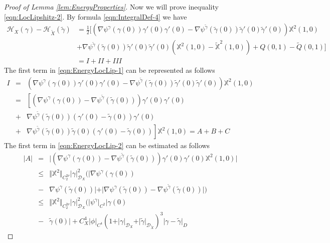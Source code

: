 \documentclass[11pt,a4paper,leqno]{amsart}%
\theoremstyle{plain}
\theoremstyle{remark}
\theoremstyle{plain}
\numberwithin{equation}{section}
\begin{document}
\begin{proof}[ Proof of Lemma \ref{lem:EnergyProperties}]
Now we will prove inequality \eqref{eqn:LocLipshitz-2}. By formula
\eqref{eqn:IntegralDef-4} we have
\begin{align}\label{eqn:EnergyLocLip-1}
\mathcal{H}_X(\gamma)-\mathcal{H}_{\tilde{X}}(\tilde{\gamma})&=\frac{1}{2}
\Big[(\nabla\psi^{\gamma}(\gamma(0))\gamma'(0)\gamma'(0)-\nabla\psi^{\tilde{\gamma}}(\tilde{\gamma}(0))\tilde{\gamma}'(0)\tilde{\gamma}'(0))
\mathbb{X}^2(1,0)\nonumber\\
&+\nabla\psi^{\tilde{\gamma}}(\tilde{\gamma}(0))\tilde{\gamma}'(0)\tilde{\gamma}'(0)(\mathbb{X}^2(1,0)-\mathbb{\tilde{X}}^2(1,0))
+Q(0,1)-\tilde{Q}(0,1)\Big]\!
\nonumber\\
 &=\!I\! +\! II\! +\! III
\end{align}
The first term in \eqref{eqn:EnergyLocLip-1} can be represented as
follows
\begin{eqnarray}
I &=&
(\nabla\psi^{\gamma}(\gamma(0))\gamma'(0)\gamma'(0)-\nabla\psi^{\tilde{\gamma}}(\tilde{\gamma}(0))\tilde{\gamma}'(0)\tilde{\gamma}'(0))
\mathbb{X}^2(1,0)\nonumber\\
 &=& \left[(\nabla\psi^{\gamma}(\gamma(0))-\nabla\psi^{\tilde{\gamma}}(\tilde{\gamma}(0)))\gamma'(0)\gamma'(0)\right.\nonumber\\
 &+& \nabla\psi^{\tilde{\gamma}}(\tilde{\gamma}(0))(\gamma'(0)-\tilde{\gamma}(0))\gamma'(0)\nonumber\\
 &+& \left.\nabla\psi^{\tilde{\gamma}}(\tilde{\gamma}(0))\tilde{\gamma}(0)(\gamma'(0)-\tilde{\gamma}(0))\right]\mathbb{X}^2(1,0)=A+B+C\label{eqn:EnergyLocLip-2}
\end{eqnarray}
The first term in \eqref{eqn:EnergyLocLip-2} can be estimated as
follows
\begin{eqnarray}\label{eqn:EnergyLocLip-3}
\vert A\vert &=&\vert (\nabla\psi^{\gamma}(\gamma(0))-\nabla\psi^{\tilde{\gamma}}(\tilde{\gamma}(0)))\gamma'(0)\gamma'(0)\mathbb{X}^2(1,0)\vert \\
&\leq&
\Vert \mathbb{X}^2\Vert_{C_2^{2\nu}}\vert \gamma\vert_{\mathcal{D}_X}^2(\vert \nabla\psi^{\gamma}
(\gamma(0))\nonumber\\
&-&\nabla\psi^{\gamma}(\tilde{\gamma}(0))\vert +\vert \nabla\psi^{\gamma}(\tilde{\gamma}(0))-\nabla\psi^{\tilde{\gamma}}(\tilde{\gamma}(0))\vert )\nonumber\\
&\leq &\Vert \mathbb{X}^2\Vert_{C_2^{2\nu}}\vert \gamma\vert_{\mathcal{D}_X}^2(\vert \psi^{\gamma}\vert_{C^2}\vert \gamma(0)
\nonumber\\
&-&\tilde{\gamma}(0)\vert
+C_X^4\vert \phi\vert_{C^4}(1+\vert \gamma\vert_{\mathcal{D}_X}+\vert \tilde{\gamma}\vert_{\mathcal{D}_{\tilde{X}}})^3\vert \gamma-\tilde{\gamma}\vert_D

\end{eqnarray}
\end{proof}
\end{document}

